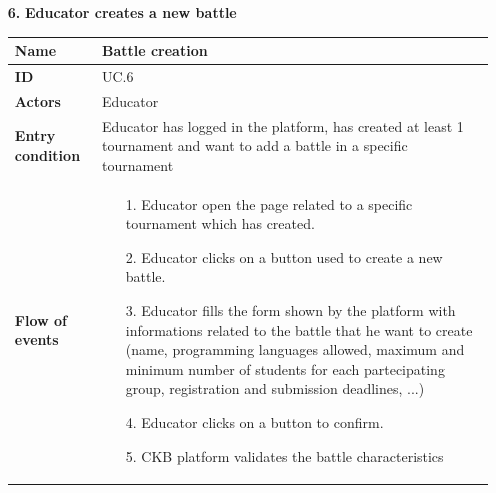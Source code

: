 \documentclass{article}
\begin{document}
{\begin{enumerate}
                    \item[\textbf{6.}] \textbf{Educator creates a new battle}
                    \begin{xltabular}{\textwidth}
                        {| >{\raggedright\arraybackslash}g | >{\raggedright\arraybackslash}X |}      
                        \hline
                        \endfirsthead
                        \hline
                        \endhead
                        \endfoot
                        \hline
                        \endlastfoot
                        

                        
                        
                        \textbf{Name} & Battle creation\\
                        \hline
                        \textbf{ID} & UC.6\\
                        \hline
                        \textbf{Actors} & Educator\\
                        \hline
                        \textbf{Entry condition} & Educator has logged in the platform, has created at least 1 tournament
                        and want to add a battle in a specific tournament \\
                        \hline
                        \textbf{Flow of events} &    \begin{enumerate}
                                                        \item[1.] Educator open the page related to a specific tournament
                                                        which has created.
                                                        \item[2.] Educator clicks on a button used to create a new battle.
                                                        \item[3.] Educator fills the form shown by the platform with informations
                                                        related to the battle that he want to create (name, programming languages
                                                        allowed, maximum and minimum number of students for each partecipating 
                                                        group, registration and submission deadlines, ...)
                                                        \item[4.] Educator clicks on a button to confirm.
                                                        \item[5.] CKB platform validates the battle characteristics

\end{enumerate}
\end{xltabular}
\end{enumerate}}
\end{document}
